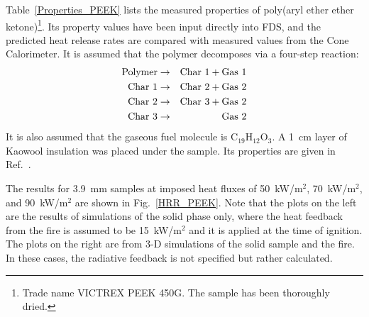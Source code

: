 Table~\ref{Properties_PEEK} lists the measured properties of poly(aryl ether ether ketone)\footnote{Trade name VICTREX PEEK 450G.
The sample has been thoroughly dried.}. Its property values have been input directly into FDS, and the predicted heat release rates
are compared with measured values from the Cone Calorimeter. It is assumed that the polymer decomposes via a four-step reaction:
\begin{eqnarray}
   \hbox{Polymer} &\to& \hbox{Char 1} + \hbox{Gas 1}  \\
   \hbox{Char 1}  &\to& \hbox{Char 2} + \hbox{Gas 2}  \\
   \hbox{Char 2}  &\to& \hbox{Char 3} + \hbox{Gas 2}  \\
   \hbox{Char 3}  &\to& \hbox{Gas 2}
\end{eqnarray}
It is also assumed that the gaseous fuel molecule is C$_{19}$H$_{12}$O$_3$.
A 1~cm layer of Kaowool insulation was placed under the sample. Its properties are given in Ref.~\cite{Stoliarov:CF2010}.

The results for 3.9~mm samples at imposed heat fluxes of 50~kW/m$^2$, 70~kW/m$^2$, and 90~kW/m$^2$ are shown in Fig.~\ref{HRR_PEEK}. Note that the plots on the left
are the results of simulations of the solid phase only, where the heat feedback from the fire is assumed to be 15~kW/m$^2$ and it is applied at the time of ignition. The
plots on the right are from 3-D simulations of the solid sample and the fire. In these cases, the radiative feedback is not specified but rather calculated.

